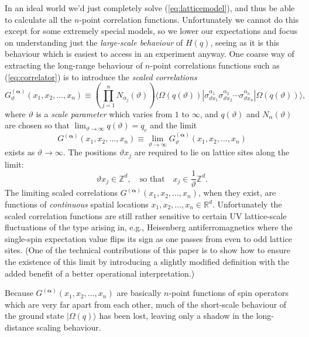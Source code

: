 \documentclass[11pt]{amsart}
\theoremstyle{plain}%
\theoremstyle{definition}
\theoremstyle{remark}
\begin{document}
In an ideal world we'd just completely solve (\ref{eq:latticemodel}), and thus be able to calculate all the $n$-point correlation functions. Unfortunately we cannot do this except for some extremely special models, so we lower our expectations and focus on understanding just the \emph{large-scale behaviour} of $H(q)$, seeing as it is this behaviour which is easiest to access in an experiment anyway. One coarse way of extracting the long-range behaviour of $n$-point correlations functions such as (\ref{eq:correlator}) is to introduce the \emph{scaled correlations}
\begin{equation}
	G^{(\boldsymbol{\alpha})}_\vartheta(x_1, x_2, \ldots, x_n) \equiv  \left(\prod_{j=1}^n N_{\alpha_j}(\vartheta)\right) \langle\Omega(q(\vartheta))|\sigma^{\alpha_1}_{\vartheta x_1}\sigma^{\alpha_2}_{\vartheta x_2} \cdots \sigma^{\alpha_n}_{\vartheta x_n}|\Omega(q(\vartheta))\rangle,
\end{equation}
where $\vartheta$ is a \emph{scale parameter} which varies from $1$ to $\infty$, and $q(\vartheta)$ and $N_{\alpha}(\vartheta)$ are chosen so that $\lim_{\vartheta\rightarrow \infty} q(\vartheta) = q_c$ and the limit  
\begin{equation}
G^{(\boldsymbol{\alpha})}(x_1, x_2, \ldots, x_n) \equiv \lim_{\vartheta\rightarrow \infty}G^{(\boldsymbol{\alpha})}_\vartheta(x_1, x_2, \ldots, x_n)
\end{equation}
exists as $\vartheta\rightarrow\infty$. The positions $\vartheta x_j$ are required to lie on lattice sites along the limit: 
\begin{equation}
	\vartheta x_j \in \mathbb{Z}^d, \quad \text{so that} \quad x_j \in \frac{1}{\vartheta} \mathbb{Z}^d.
\end{equation}
The limiting scaled correlations $G^{(\boldsymbol{\alpha})}(x_1, x_2, \ldots, x_n)$, when they exist, are functions of \emph{continuous} spatial locations $x_1, x_2, \ldots, x_n\in \mathbb{R}^d$. Unfortunately the scaled correlation functions are still rather sensitive to certain UV lattice-scale fluctuations of the type arising in, e.g., Heisenberg antiferromagnetics where the single-spin expectation value flips its sign as one passes from even to odd lattice sites. (One of the technical contributions of this paper is to show how to ensure the existence of this limit by introducing a slightly modified definition with the added benefit of a better operational interpretation.) 

Because $G^{(\boldsymbol{\alpha})}(x_1, x_2, \ldots, x_n)$ are basically $n$-point functions of spin operators which are very far apart from each other, much of the short-scale behaviour of the ground state $|\Omega(q)\rangle$ has been lost, leaving only a shadow in the long-distance scaling behaviour.
\end{document}
